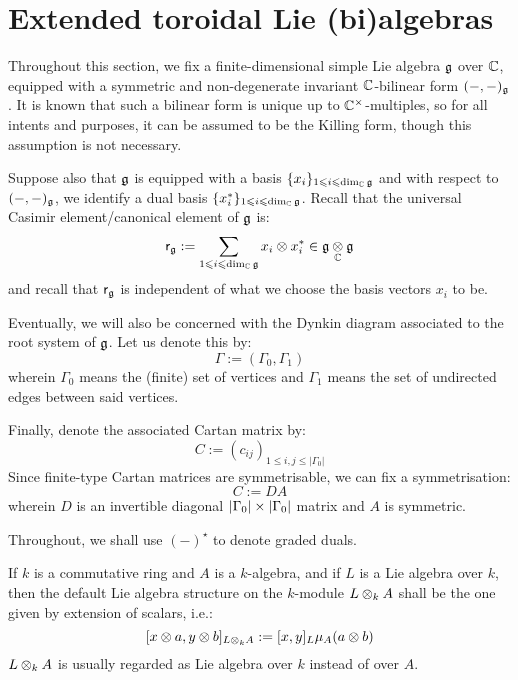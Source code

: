\section{Extended toroidal Lie (bi)algebras}
    \begin{convention} \label{conv: a_fixed_finite_dimensional_simple_lie_algebra}
        Throughout this section, we fix a finite-dimensional simple Lie algebra $\mathfrak{g}$ over $\mathbb{C}$, equipped with a symmetric and non-degenerate invariant $\mathbb{C}$-bilinear form $(-, -)_{\mathfrak{g}}$. It is known that such a bilinear form is unique up to $\bbC^{\x}$-multiples, so for all intents and purposes, it can be assumed to be the Killing form, though this assumption is not necessary. 

        Suppose also that $\mathfrak{g}$ is equipped with a basis $\{x_i\}_{1 \leqslant i \leqslant \dim_{\mathbb{C}} \mathfrak{g}}$ and with respect to $(-, -)_{\mathfrak{g}}$, we identify a dual basis $\{x_i^*\}_{1 \leqslant i \leqslant \dim_{\mathbb{C}} \mathfrak{g}}$. Recall that the universal Casimir element/canonical element of $\mathfrak{g}$ is:
            $$\sfr_{\g} := \sum_{1 \leq i \leq \dim_{\bbC} \g} x_i \tensor x_i^* \in \g \tensor_{\bbC} \g$$
        and recall that $\mathsf{r}_{\mathfrak{g}}$ is independent of what we choose the basis vectors $x_i$ to be.

        Eventually, we will also be concerned with the Dynkin diagram associated to the root system of $\mathfrak{g}$. Let us denote this by:
            $$\Gamma := (\Gamma_0, \Gamma_1)$$
        wherein $\Gamma_0$ means the (finite) set of vertices and $\Gamma_1$ means the set of undirected edges between said vertices. 

        Finally, denote the associated Cartan matrix by:
            $$C := (c_{ij})_{1 \leq i, j \leq |\Gamma_0|}$$
        Since finite-type Cartan matrices are symmetrisable, we can fix a symmetrisation:
            $$C := D A$$
        wherein $D$ is an invertible diagonal $|\Gamma_0| \x |\Gamma_0|$ matrix and $A$ is symmetric. 
    \end{convention}

    \begin{convention}
        Throughout, we shall use $(-)^{\star}$ to denote graded duals. 
    \end{convention}

    \begin{convention}
        If $k$ is a commutative ring and $A$ is a $k$-algebra, and if $L$ is a Lie algebra over $k$, then the default Lie algebra structure on the $k$-module $L \tensor_k A$ shall be the one given by extension of scalars, i.e.:
            $$[x \tensor a, y \tensor b]_{L \tensor_k A} := [x, y]_L \mu_A(a \tensor b)$$
        $L \tensor_k A$ is usually regarded as Lie algebra over $k$ instead of over $A$.  
    \end{convention}

